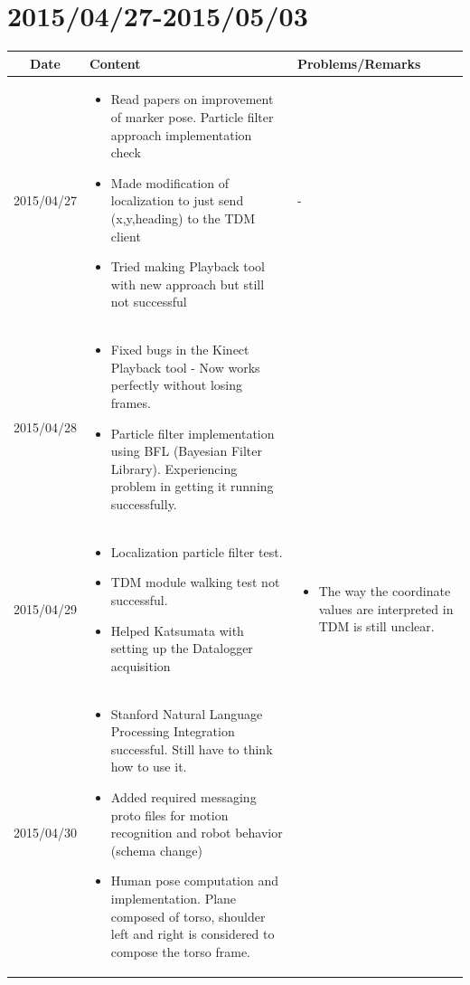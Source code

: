 \documentclass[11pt]{article} %
\begin{document}
\newpage
\section{2015/04/27-2015/05/03}

\begin{center}
    \begin{longtable}{ | c | p{6cm} | p{5cm} |}
    \hline
    Date & Content & Problems/Remarks \\ 
    \endhead
    \hline    
     2015/04/27         & 
  \begin{itemize}
  \item Read papers on improvement of marker pose. Particle filter approach implementation check
  \item Made modification of localization to just send (x,y,heading) to the TDM client
  \item Tried making Playback tool with new approach but still not successful
\end{itemize}  
   & - \\
\hline
  										 
 2015/04/28         & 
  \begin{itemize}
  \item Fixed bugs in the Kinect Playback tool - Now works perfectly without losing frames.
  \item Particle filter implementation using BFL (Bayesian Filter Library). Experiencing problem in getting it running successfully.
\end{itemize}   
& 
 \\
\hline
  										 
  
  2015/04/29        & 
  \begin{itemize}
  \item Localization particle filter test.
  \item TDM module walking test not successful.
  \item Helped Katsumata with setting up the Datalogger acquisition
  \end{itemize}   
  										 & 
  \begin{itemize}
  \item The way the coordinate values are interpreted in TDM is still unclear.
  \end{itemize}
  										 \\
  \hline
  
  2015/04/30         & 
  \begin{itemize}
  \item Stanford Natural Language Processing Integration successful. Still have to think how to use it.
  \item Added required messaging proto files for motion recognition and robot behavior (schema change)
  \item Human pose computation and implementation. Plane composed of torso, shoulder left and right is considered to compose the torso frame.
  \end{itemize}
  & 
\\  										 \hline


\end{longtable}
\end{center}
\end{document}

